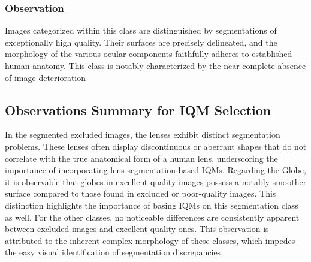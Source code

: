 \subsubsection{Observation}
Images categorized within this class are distinguished by segmentations of exceptionally high quality. Their surfaces are precisely delineated, and the morphology of the various ocular components faithfully adheres to established human anatomy. This class is notably characterized by the near-complete absence of image deterioration
\subsection{Observations Summary for IQM Selection}
\label{sec:iqm_selection_summary}
In the segmented excluded images, the lenses exhibit distinct segmentation problems. These lenses often display discontinuous or aberrant shapes that do not correlate with the true anatomical form of a human lens, underscoring the importance of incorporating lens-segmentation-based IQMs. Regarding the Globe, it is observable that globes in excellent quality images possess a notably smoother surface compared to those found in excluded or poor-quality images. This distinction highlights the importance of basing IQMs on this segmentation class as well. For the other classes, no noticeable differences are consistently apparent between excluded images and excellent quality ones. This observation is attributed to the inherent complex morphology of these classes, which impedes the easy visual identification of segmentation discrepancies.